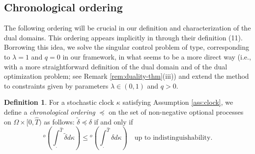 \documentclass[11pt, oneside]{article}   	%
\theoremstyle{plain}
\theoremstyle{definition}
\newtheorem{defn}[thm]{Definition}
\theoremstyle{remark}
\begin{document}

\subsection{Chronological ordering}
The following ordering will be crucial in our definition and characterization of the dual domains. This ordering appears implicitly in \cite{BK} through their definition (11). Borrowing this idea, we solve the singular control problem of \cite{BK} type, corresponding to $\lambda=1$ and $q=0$ in our framework, in what seems to be a more direct way (i.e., with a more straightforward definition of the dual domain and of the dual optimization problem; see Remark \ref{rem:duality-thm}(iii)) and extend the method to constraints given by parameters $\lambda\in(0,1)$ and $q>0$.
\begin{defn}\label{defn:chron-ord}
For a stochastic clock $\kappa$ satisfying Assumption \ref{ass:clock}, we define a \textit{chronological ordering} $\preceq$ on the set of non-negative optional processes on $\Omega\times[0,\hat{T})$ as follows: $\tilde{\delta}\preceq\delta$ if and only if
\begin{equation}\label{def:chron-ord}
^o\left(\int_.^{\hat{T}} \tilde{\delta}d\kappa\right)\leq{}^o\left(\int_.^{\hat{T}} \delta d\kappa\right)\quad \text{up to indistinguishability}.
\end{equation}
\end{defn}
\end{document}
